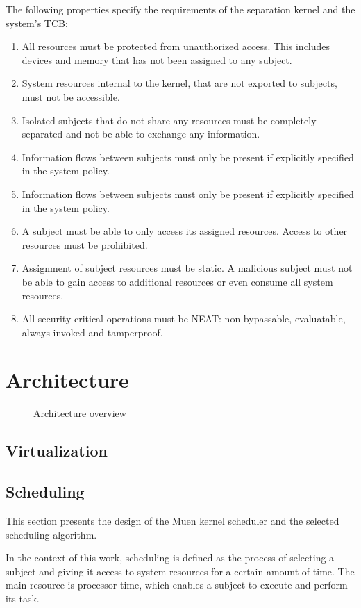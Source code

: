 The following properties specify the requirements of the separation kernel and
the system's TCB:
\begin{enumerate}
	\item All resources must be protected from unauthorized access. This
		includes devices and memory that has not been assigned to any subject.
	\item System resources internal to the kernel, that are not exported to
		subjects, must not be accessible.
	\item Isolated subjects that do not share any resources must be completely
		separated and not be able to exchange any information.
	\item Information flows between subjects must only be present if explicitly
		specified in the system policy.
	\item Information flows between subjects must only be present if explicitly
		specified in the system policy.
	\item A subject must be able to only access its assigned resources. Access
		to other resources must be prohibited.
	\item Assignment of subject resources must be static. A malicious subject
		must not be able to gain access to additional resources or even consume
		all system resources.
	\item All security critical operations must be NEAT: non-bypassable,
		evaluatable, always-invoked and tamperproof.
\end{enumerate}

\section{Architecture}
\begin{figure}[h]
	\centering
	
	\caption{Architecture overview}
	\label{fig:architecture-overview}
\end{figure}

\subsection{Virtualization}
\subsection{Scheduling}\label{subsec:scheduling}
This section presents the design of the Muen kernel scheduler and the selected
scheduling algorithm.

In the context of this work, scheduling is defined as the process of selecting
a subject and giving it access to system resources for a certain amount of time.
The main resource is processor time, which enables a subject to execute and
perform its task.

